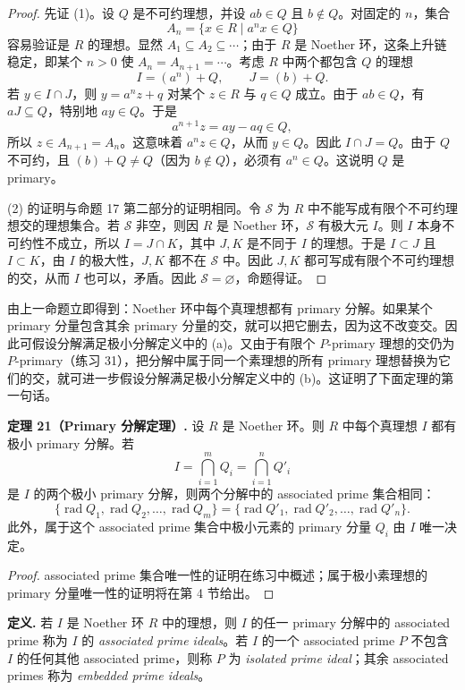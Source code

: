 \begin{proof}
	先证 (1)。设 $Q$ 是不可约理想，并设 $ab\in Q$ 且 $b\notin Q$。对固定的 $n$，集合
	\[
	A_n=\{x\in R\mid a^n x\in Q\}
	\]
	容易验证是 $R$ 的理想。显然 $A_1\subseteq A_2\subseteq\cdots$；由于 $R$ 是 Noether 环，这条上升链稳定，即某个 $n>0$ 使 $A_n=A_{n+1}=\cdots$。考虑 $R$ 中两个都包含 $Q$ 的理想
	\[
	I=(a^n)+Q,
	\qquad
	J=(b)+Q.
	\]
	若 $y\in I\cap J$，则 $y=a^nz+q$ 对某个 $z\in R$ 与 $q\in Q$ 成立。由于 $ab\in Q$，有 $aJ\subseteq Q$，特别地 $ay\in Q$。于是
	\[
	a^{n+1}z=ay-aq\in Q,
	\]
	所以 $z\in A_{n+1}=A_n$。这意味着 $a^nz\in Q$，从而 $y\in Q$。因此 $I\cap J=Q$。由于 $Q$ 不可约，且 $(b)+Q\ne Q$（因为 $b\notin Q$），必须有 $a^n\in Q$。这说明 $Q$ 是 primary。
	
	(2) 的证明与命题 17 第二部分的证明相同。令 $\mathcal S$ 为 $R$ 中不能写成有限个不可约理想交的理想集合。若 $\mathcal S$ 非空，则因 $R$ 是 Noether 环，$\mathcal S$ 有极大元 $I$。则 $I$ 本身不可约性不成立，所以 $I=J\cap K$，其中 $J,K$ 是不同于 $I$ 的理想。于是 $I\subset J$ 且 $I\subset K$，由 $I$ 的极大性，$J,K$ 都不在 $\mathcal S$ 中。因此 $J,K$ 都可写成有限个不可约理想的交，从而 $I$ 也可以，矛盾。因此 $\mathcal S=\varnothing$，命题得证。
\end{proof}

由上一命题立即得到：Noether 环中每个真理想都有 primary 分解。如果某个 primary 分量包含其余 primary 分量的交，就可以把它删去，因为这不改变交。因此可假设分解满足极小分解定义中的 (a)。又由于有限个 $P$-primary 理想的交仍为 $P$-primary（练习 31），把分解中属于同一个素理想的所有 primary 理想替换为它们的交，就可进一步假设分解满足极小分解定义中的 (b)。这证明了下面定理的第一句话。

\noindent\textbf{定理 21（Primary 分解定理）.} 设 $R$ 是 Noether 环。则 $R$ 中每个真理想 $I$ 都有极小 primary 分解。若
\[
I=\bigcap_{i=1}^m Q_i=\bigcap_{i=1}^n Q'_i
\]
是 $I$ 的两个极小 primary 分解，则两个分解中的 associated prime 集合相同：
\[
\{\operatorname{rad}Q_1,\operatorname{rad}Q_2,
\ldots,\operatorname{rad}Q_m\}
=
\{\operatorname{rad}Q'_1,\operatorname{rad}Q'_2,
\ldots,\operatorname{rad}Q'_n\}.
\]
此外，属于这个 associated prime 集合中极小元素的 primary 分量 $Q_i$ 由 $I$ 唯一决定。

\begin{proof}
	associated prime 集合唯一性的证明在练习中概述；属于极小素理想的 primary 分量唯一性的证明将在第 4 节给出。
\end{proof}

\noindent\textbf{定义.} 若 $I$ 是 Noether 环 $R$ 中的理想，则 $I$ 的任一 primary 分解中的 associated prime 称为 $I$ 的 \emph{associated prime ideals}。若 $I$ 的一个 associated prime $P$ 不包含 $I$ 的任何其他 associated prime，则称 $P$ 为 \emph{isolated prime ideal}；其余 associated primes 称为 \emph{embedded prime ideals}。

